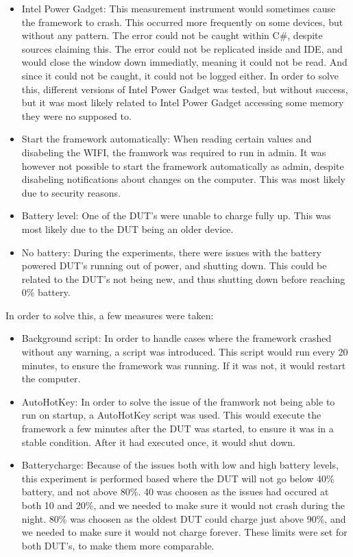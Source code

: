 \begin{itemize}
    \item Intel Power Gadget: This measurement instrument would sometimes cause the framework to crash. This occurred more frequently on some devices, but without any pattern. The error could not be caught within C\#, despite sources claiming this\cite*[]{cpp_exceptions}. The error could not be replicated inside and IDE, and would close the window down immediatly, meaning it could not be read. And since it could not be caught, it could not be logged either. In order to solve this, different versions of Intel Power Gadget was tested, but without success, but it was most likely related to Intel Power Gadget accessing some memory they were no supposed to.
    \item Start the framework automatically: When reading certain values and disabeling the WIFI, the framwork was required to run in admin. It was however not possible to start the framework automatically as admin, despite disabeling notifications about changes on the computer. This was most likely due to security reasons.
    \item Battery level: One of the DUT's were unable to charge fully up. This was most likely due to the DUT being an older device.
    \item No battery: During the experiments, there were issues with the battery powered DUT's running out of power, and shutting down. This could be related to the DUT's not being new, and thus shutting down before reaching 0\% battery.
\end{itemize}

In order to solve this, a few measures were taken:

\begin{itemize}
    \item Background script: In order to handle cases where the framework crashed without any warning, a script was introduced. This script would run every 20 minutes, to ensure the framework was running. If it was not, it would restart the computer.
    \item AutoHotKey: In order to solve the issue of the framwork not being able to run on startup, a AutoHotKey script was used. This would execute the framework a few minutes after the DUT was started, to ensure it was in a stable condition. After it had executed once, it would shut down.
    \item Batterycharge: Because of the issues both with low and high battery levels, this experiment is performed based where the DUT will not go below 40\% battery, and not above 80\%. 40 was choosen as the issues had occured at both 10 and 20\%, and we needed to make sure it would not crash during the night. 80\% was choosen as the oldest DUT could charge just above 90\%, and we needed to make sure it would not charge forever. These limits were set for both DUT's, to make them more comparable.
\end{itemize}

